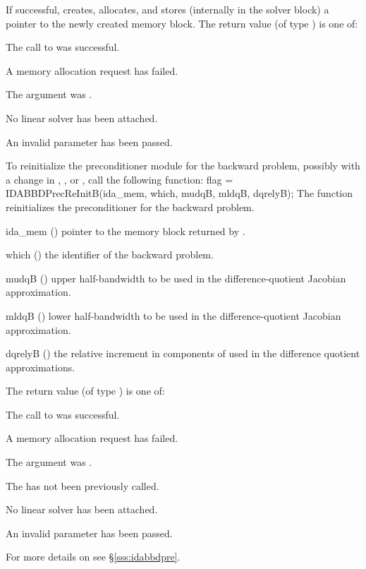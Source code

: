 {
  If successful,  creates, allocates, and stores (internally
  in the {\idas} solver block) a pointer to the newly created
  {\idabbdpre} memory block.
  The return value  (of type ) is one of:
  \begin{args}
  \item[\Id{IDALS\_SUCCESS}]
    The call to  was successful.
  \item[\Id{IDALS\_MEM\_FAIL}]
    A memory allocation request has failed.
  \item[\Id{IDALS\_MEM\_NULL}]
    The  argument was .
  \item[\Id{IDALS\_LMEM\_NULL}]
    No linear solver has been attached.
  \item[\Id{IDALS\_ILL\_INPUT}]
    An invalid parameter has been passed.
  \end{args}
}
{}
To reinitialize the {\idabbdpre} preconditioner module for the backward problem,
possibly with a change in , , or , call the
following function:
{
  flag = IDABBDPrecReInitB(ida\_mem, which, mudqB, mldqB, dqrelyB);
}
{
  The function  reinitializes the {\idabbdpre} preconditioner
  for the backward problem.
}
{
  \begin{args}
  \item[ida\_mem] ()
    pointer to the {\idas} memory block returned by .
  \item[which] ()
    the identifier of the backward problem.
  \item[mudqB] ()
    upper half-bandwidth to be used in the difference-quotient Jacobian approximation.
  \item[mldqB] ()
    lower half-bandwidth to be used in the difference-quotient Jacobian approximation.
  \item[dqrelyB] ()
    the relative increment in components of  used in the difference quotient
    approximations.
  \end{args}
}
{
  The return value  (of type ) is one of:
  \begin{args}
  \item[\Id{IDALS\_SUCCESS}]
    The call to  was successful.
  \item[\Id{IDALS\_MEM\_FAIL}]
    A memory allocation request has failed.
  \item[\Id{IDALS\_MEM\_NULL}]
    The  argument was .
  \item[\Id{IDALS\_PMEM\_NULL}]
    The  has not been previously called.
  \item[\Id{IDALS\_LMEM\_NULL}]
    No linear solver has been attached.
  \item[\Id{IDALS\_ILL\_INPUT}]
    An invalid parameter has been passed.
  \end{args}
}
{}
For more details on {\idabbdpre} see \S\ref{sss:idabbdpre}.

